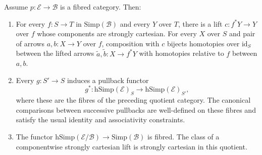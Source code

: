 \begin{lemma}
\label{lemma-illusie-I-relative-homotopy-base-change}
Assume $p:\mathcal E\to\mathcal B$ is a fibred category. Then:
\begin{enumerate}
\item For every $f:S\to T$ in $\mathrm{Simp}(\mathcal B)$ and every
$Y$ over $T$, there is a lift $c:f^*Y\to Y$ over $f$ whose components are
strongly cartesian. For every $X$ over $S$ and pair of arrows $a,b:X\to Y$
over $f$, composition with $c$ bijects homotopies over $\mathrm{id}_S$
between the lifted arrows $\widetilde a,\widetilde b:X\to f^*Y$ with
homotopies relative to $f$ between $a,b$.
\item Every $g:S'\to S$ induces a pullback functor
$$
g^*:\mathrm{hSimp}(\mathcal E)_S
\longrightarrow\mathrm{hSimp}(\mathcal E)_{S'},
$$
where these are the fibres of the preceding quotient category. The
canonical comparisons between successive pullbacks are well-defined on
these fibres and satisfy the usual identity and associativity constraints.
\item The functor
$\mathrm{hSimp}(\mathcal E/\mathcal B)\to\mathrm{Simp}(\mathcal B)$
is fibred. The class of a componentwise strongly cartesian lift is strongly
cartesian in this quotient.
\end{enumerate}
\end{lemma}

